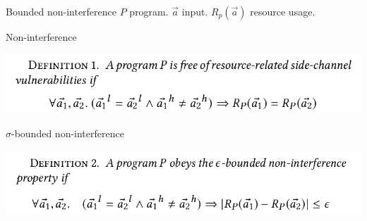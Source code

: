 \documentclass[page number]{beamer}
\begin{document}
\begin{frame}{Bounded non-interference}
  $P$ program. $\overrightarrow{a}$ input. $R_p(\overrightarrow{a})$ resource usage.
  \vfill
  \begin{block}{Non-interference}
    \begin{center}
      \includegraphics[scale=0.3]{img_chen/def1.png}
    \end{center}
  \end{block}
  \vfill
  \begin{block}{$\sigma$-bounded non-interference}
    \begin{center}
      \includegraphics[scale=0.3]{img_chen/def2.png}
    \end{center}
  \end{block}    
\end{frame}
\end{document}
